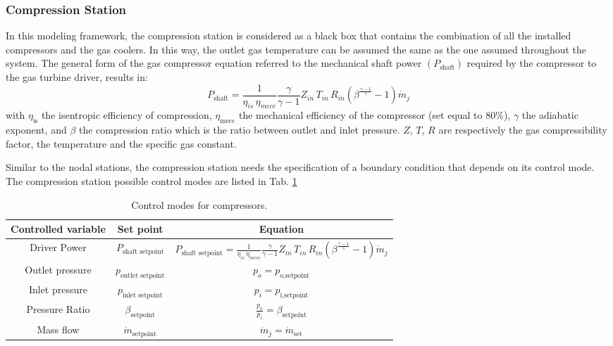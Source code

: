 \subsubsection{Compression Station}

In this modeling framework, the compression station is considered as a black box that contains the combination of all the installed compressors and the gas coolers. In this way, the outlet gas temperature can be assumed the same as the one assumed throughout the system. The general form of the gas compressor equation referred to the mechanical shaft power $(P_{\text{shaft}})$ required by the compressor to the gas turbine driver, results in:
\[
P_{\text{shaft}} = \frac{1}{\eta_{is} \, \eta_{mecc}} 
   \frac{\gamma}{\gamma - 1} 
   Z_{in} \, T_{in} \, R_{in} 
   \left( \beta^{\frac{\gamma - 1}{\gamma}} - 1 \right) 
   \dot{m}_j
\]
with $\eta_{\text{is}}$  the isentropic efficiency of compression, $\eta_{\text{mecc}}$ the mechanical efficiency of the compressor (set equal to 80\%), $\gamma$ the adiabatic exponent, and $\beta$ the compression ratio which is the ratio between outlet and inlet pressure. $Z$, $T$, $R$ are respectively the gas compressibility factor, the temperature and the specific gas constant.

Similar to the nodal stations, the compression station needs the specification of a boundary condition that depends on its control mode. The compression station possible control modes are listed in Tab. \ref{tab:compressor:controls}
\begin{table}[h]
    \centering
    \begin{tabular}{ccc}
    \hline
    Controlled variable & Set point & Equation
    \\ \hline    
    Driver Power &  $P_{\text{shaft setpoint}}$ & $
P_{\text{shaft setpoint}} = \frac{1}{\eta_{is} \, \eta_{mecc}} 
   \frac{\gamma}{\gamma - 1} 
   Z_{in} \, T_{in} \, R_{in} 
   \left( \beta^{\frac{\gamma - 1}{\gamma}} - 1 \right) 
   \dot{m}_j
$ \\
    Outlet pressure  &  $p_{\text{outlet setpoint}}$ & $p_o = p_\text{o,setpoint}$\\
    Inlet pressure  &  $p_{\text{inlet setpoint}}$ & $p_i = p_\text{i,setpoint}$\\
    Pressure Ratio  &  $\beta_{\text{setpoint}}$ & $\frac{p_o}{p_i}=\beta_{\text{setpoint}}$\\
    Mass flow  &  $\dot{m}_{\text{setpoint}}$ & $\dot m_j = \dot m_\text{set}$\\
    \hline
    \end{tabular}
    \caption{Control modes for compressors.}
    \label{tab:compressor:controls}
\end{table}

